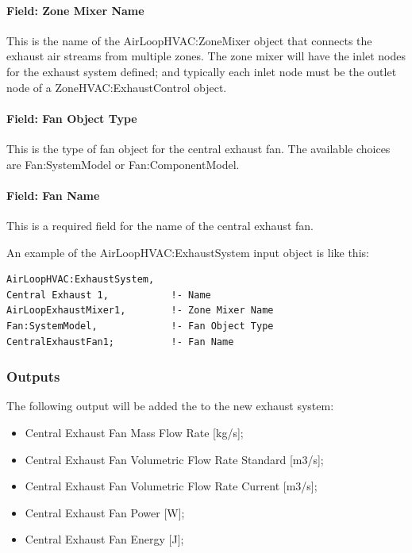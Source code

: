 \paragraph{Field: Zone Mixer Name}

This is the name of the AirLoopHVAC:ZoneMixer object that connects the exhaust air streams from multiple zones. The zone mixer will have the inlet nodes for the exhaust system defined; and typically each inlet node must be the outlet node of a ZoneHVAC:ExhaustControl object.

\paragraph{Field: Fan Object Type}

This is the type of fan object for the central exhaust fan. The available choices are Fan:SystemModel or Fan:ComponentModel.

\paragraph{Field: Fan Name}

This is a required field for the name of the central exhaust fan.

An example of the AirLoopHVAC:ExhaustSystem input object is like this:

\begin{lstlisting}
AirLoopHVAC:ExhaustSystem,
Central Exhaust 1,           !- Name
AirLoopExhaustMixer1,        !- Zone Mixer Name    
Fan:SystemModel,             !- Fan Object Type
CentralExhaustFan1;          !- Fan Name
\end{lstlisting}

\subsubsection{Outputs}

The following output will be added the to the new exhaust system: 

\begin{itemize}

\item Central Exhaust Fan Mass Flow Rate [kg/s];
\item Central Exhaust Fan Volumetric Flow Rate Standard [m3/s];
\item Central Exhaust Fan Volumetric Flow Rate Current [m3/s];
\item Central Exhaust Fan Power [W];
\item Central Exhaust Fan Energy [J];

\end{itemize}

